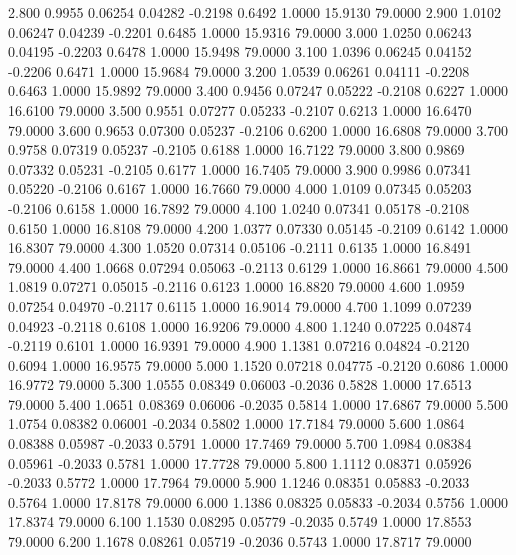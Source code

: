    2.800   0.9955   0.06254   0.04282  -0.2198   0.6492   1.0000  15.9130  79.0000
   2.900   1.0102   0.06247   0.04239  -0.2201   0.6485   1.0000  15.9316  79.0000
   3.000   1.0250   0.06243   0.04195  -0.2203   0.6478   1.0000  15.9498  79.0000
   3.100   1.0396   0.06245   0.04152  -0.2206   0.6471   1.0000  15.9684  79.0000
   3.200   1.0539   0.06261   0.04111  -0.2208   0.6463   1.0000  15.9892  79.0000
   3.400   0.9456   0.07247   0.05222  -0.2108   0.6227   1.0000  16.6100  79.0000
   3.500   0.9551   0.07277   0.05233  -0.2107   0.6213   1.0000  16.6470  79.0000
   3.600   0.9653   0.07300   0.05237  -0.2106   0.6200   1.0000  16.6808  79.0000
   3.700   0.9758   0.07319   0.05237  -0.2105   0.6188   1.0000  16.7122  79.0000
   3.800   0.9869   0.07332   0.05231  -0.2105   0.6177   1.0000  16.7405  79.0000
   3.900   0.9986   0.07341   0.05220  -0.2106   0.6167   1.0000  16.7660  79.0000
   4.000   1.0109   0.07345   0.05203  -0.2106   0.6158   1.0000  16.7892  79.0000
   4.100   1.0240   0.07341   0.05178  -0.2108   0.6150   1.0000  16.8108  79.0000
   4.200   1.0377   0.07330   0.05145  -0.2109   0.6142   1.0000  16.8307  79.0000
   4.300   1.0520   0.07314   0.05106  -0.2111   0.6135   1.0000  16.8491  79.0000
   4.400   1.0668   0.07294   0.05063  -0.2113   0.6129   1.0000  16.8661  79.0000
   4.500   1.0819   0.07271   0.05015  -0.2116   0.6123   1.0000  16.8820  79.0000
   4.600   1.0959   0.07254   0.04970  -0.2117   0.6115   1.0000  16.9014  79.0000
   4.700   1.1099   0.07239   0.04923  -0.2118   0.6108   1.0000  16.9206  79.0000
   4.800   1.1240   0.07225   0.04874  -0.2119   0.6101   1.0000  16.9391  79.0000
   4.900   1.1381   0.07216   0.04824  -0.2120   0.6094   1.0000  16.9575  79.0000
   5.000   1.1520   0.07218   0.04775  -0.2120   0.6086   1.0000  16.9772  79.0000
   5.300   1.0555   0.08349   0.06003  -0.2036   0.5828   1.0000  17.6513  79.0000
   5.400   1.0651   0.08369   0.06006  -0.2035   0.5814   1.0000  17.6867  79.0000
   5.500   1.0754   0.08382   0.06001  -0.2034   0.5802   1.0000  17.7184  79.0000
   5.600   1.0864   0.08388   0.05987  -0.2033   0.5791   1.0000  17.7469  79.0000
   5.700   1.0984   0.08384   0.05961  -0.2033   0.5781   1.0000  17.7728  79.0000
   5.800   1.1112   0.08371   0.05926  -0.2033   0.5772   1.0000  17.7964  79.0000
   5.900   1.1246   0.08351   0.05883  -0.2033   0.5764   1.0000  17.8178  79.0000
   6.000   1.1386   0.08325   0.05833  -0.2034   0.5756   1.0000  17.8374  79.0000
   6.100   1.1530   0.08295   0.05779  -0.2035   0.5749   1.0000  17.8553  79.0000
   6.200   1.1678   0.08261   0.05719  -0.2036   0.5743   1.0000  17.8717  79.0000
